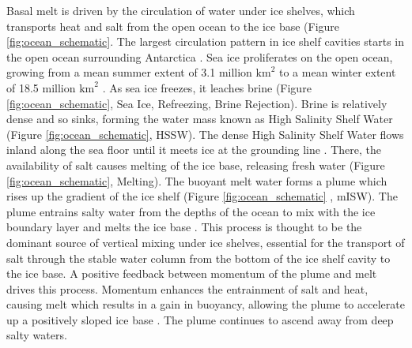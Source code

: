 Basal melt is driven by the circulation of water under ice shelves, which transports heat and salt from the open ocean to the ice base (Figure {\ref{fig:ocean_schematic}}. The largest circulation pattern in ice shelf cavities starts in the open ocean surrounding Antarctica \citep{jacobs1979circulation}. Sea ice proliferates on the open ocean, growing from a mean summer extent of 3.1 million $\mathrm{km}^2$ to a mean winter extent of 18.5 million $\mathrm{km}^2$  \citep{hobbs2016review}. As sea ice freezes, it leaches brine (Figure {\ref{fig:ocean_schematic}}, Sea Ice, Refreezing, Brine Rejection). Brine is relatively dense and so sinks, forming the water mass known as High Salinity Shelf Water (Figure {\ref{fig:ocean_schematic}}, HSSW). The dense High Salinity Shelf Water flows inland along the sea floor until it meets ice at the grounding line \citep{jacobs1979circulation}. There, the availability of salt causes melting of the ice base, releasing fresh water (Figure {\ref{fig:ocean_schematic}}, Melting). The buoyant melt water forms a plume which rises up the gradient of the ice shelf (Figure {\ref{fig:ocean_schematic}
}, mISW). The plume entrains salty water from the depths of the ocean to mix with the ice boundary layer and melts the ice base \citep{jacobs1979circulation}. 
This process is thought to be the dominant source of vertical mixing under ice shelves, essential for the transport of salt through the stable water column from the bottom of the ice shelf cavity to the ice base.  
A positive feedback between momentum of the plume and melt drives this process. Momentum enhances the entrainment of salt and heat, causing melt which results in a gain in buoyancy, allowing the plume to accelerate up a positively sloped ice base  \citep{jenkins1991one}.  The plume continues to ascend away from deep salty waters. 

